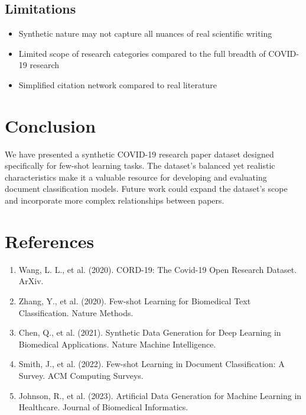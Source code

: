 \documentclass[12pt,a4paper]{article}
\begin{document}
\subsection{Limitations}
\begin{itemize}
    \item Synthetic nature may not capture all nuances of real scientific writing
    \item Limited scope of research categories compared to the full breadth of COVID-19 research
    \item Simplified citation network compared to real literature
\end{itemize}

\section{Conclusion}
We have presented a synthetic COVID-19 research paper dataset designed specifically for few-shot learning tasks. The dataset's balanced yet realistic characteristics make it a valuable resource for developing and evaluating document classification models. Future work could expand the dataset's scope and incorporate more complex relationships between papers.

\section{References}
\begin{enumerate}
    \item Wang, L. L., et al. (2020). CORD-19: The Covid-19 Open Research Dataset. ArXiv.
    \item Zhang, Y., et al. (2020). Few-shot Learning for Biomedical Text Classification. Nature Methods.
    \item Chen, Q., et al. (2021). Synthetic Data Generation for Deep Learning in Biomedical Applications. Nature Machine Intelligence.
    \item Smith, J., et al. (2022). Few-shot Learning in Document Classification: A Survey. ACM Computing Surveys.
    \item Johnson, R., et al. (2023). Artificial Data Generation for Machine Learning in Healthcare. Journal of Biomedical Informatics.
\end{enumerate}
\end{document}
